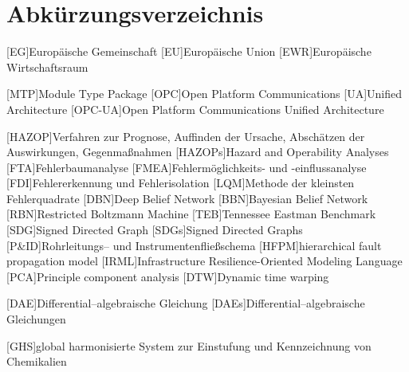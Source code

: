 \chapter*{Abk\"urzungsverzeichnis}
\begin{acronym}[12. BImSchV] %
	[EG]{Europ\"aische Gemeinschaft} %
	[EU]{Europ\"aische Union} %
	[EWR]{Europ\"aische Wirtschaftsraum }
	
  [MTP]{Module Type Package}	
  [OPC]{Open Platform Communications}
  [UA]{Unified Architecture}
  [OPC-UA]{Open Platform Communications Unified Architecture}
	
	[HAZOP]{Verfahren zur Prognose, Auffinden der Ursache, Absch\"atzen der Auswirkungen, Gegenma\ss{}nahmen }
	[HAZOPs]{Hazard and Operability Analyses}
	[FTA]{Fehlerbaumanalyse }
	[FMEA]{Fehlerm\"oglichkeits- und -einflussanalyse }
	[FDI]{Fehlererkennung und Fehlerisolation }
	[LQM]{Methode der kleinsten Fehlerquadrate }
	[DBN]{Deep Belief Network}
	[BBN]{Bayesian Belief Network}
	[RBN]{Restricted Boltzmann Machine}
	[TEB]{Tennessee Eastman Benchmark}
	[SDG]{Signed Directed Graph}
	[SDGs]{Signed Directed Graphs}
	[P\&{}ID]{Rohrleitungs-- und Instrumentenflie\ss{}schema }
	[HFPM]{hierarchical fault propagation model}
	[IRML]{Infrastructure Resilience-Oriented Modeling Language}
	[PCA]{Principle component analysis}
	[DTW]{Dynamic time warping}
	
	[DAE]{Differential--algebraische Gleichung }
	[DAEs]{Differential--algebraische Gleichungen }
	
	[GHS]{global harmonisierte System zur Einstufung und Kennzeichnung von Chemikalien}
		

\end{acronym}
